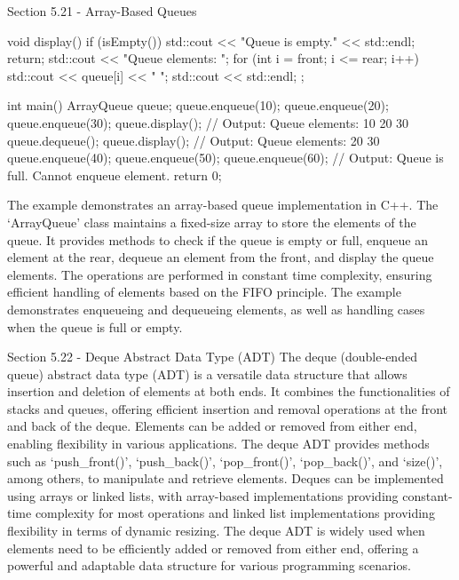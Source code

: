 \begin{notes}{Section 5.21 - Array-Based Queues}
\begin{highlight}
\begin{code}[C++]
{        void display() {
            if (isEmpty()) {
                std::cout << "Queue is empty." << std::endl;
                return;
            }
            std::cout << "Queue elements: ";
            for (int i = front; i <= rear; i++) {
                std::cout << queue[i] << " ";
            }
            std::cout << std::endl;
        }
    };
    
    int main() {
        ArrayQueue queue;
        queue.enqueue(10);
        queue.enqueue(20);
        queue.enqueue(30);
        queue.display();  // Output: Queue elements: 10 20 30
        queue.dequeue();
        queue.display();  // Output: Queue elements: 20 30
        queue.enqueue(40);
        queue.enqueue(50);
        queue.enqueue(60);  // Output: Queue is full. Cannot enqueue element.
        return 0;
    }
    \end{code}
        The example demonstrates an array-based queue implementation in C++. The `ArrayQueue' class maintains a fixed-size array to store the elements of the queue. It provides methods to check if the queue is empty or full, enqueue an element at the rear, dequeue an element from the front, and display the queue elements. The operations are performed in constant time complexity, ensuring efficient handling 
        of elements based on the FIFO principle. The example demonstrates enqueueing and dequeueing elements, as well as handling cases when the queue is full or empty.
    \end{highlight}
\end{notes}

\begin{notes}{Section 5.22 - Deque Abstract Data Type (ADT)}
    The deque (double-ended queue) abstract data type (ADT) is a versatile data structure that allows insertion and deletion of elements at both ends. It combines the functionalities of stacks and queues, offering efficient insertion and removal operations at the front and back of the deque. Elements can be added or removed from either end, enabling flexibility in various applications. The deque ADT provides 
    methods such as `push\_front()', `push\_back()', `pop\_front()', `pop\_back()', and `size()', among others, to manipulate and retrieve elements. Deques can be implemented using arrays or linked lists, with array-based implementations providing constant-time complexity for most operations and linked list implementations providing flexibility in terms of dynamic resizing. The deque ADT is widely used when elements 
    need to be efficiently added or removed from either end, offering a powerful and adaptable data structure for various programming scenarios.
\end{notes}